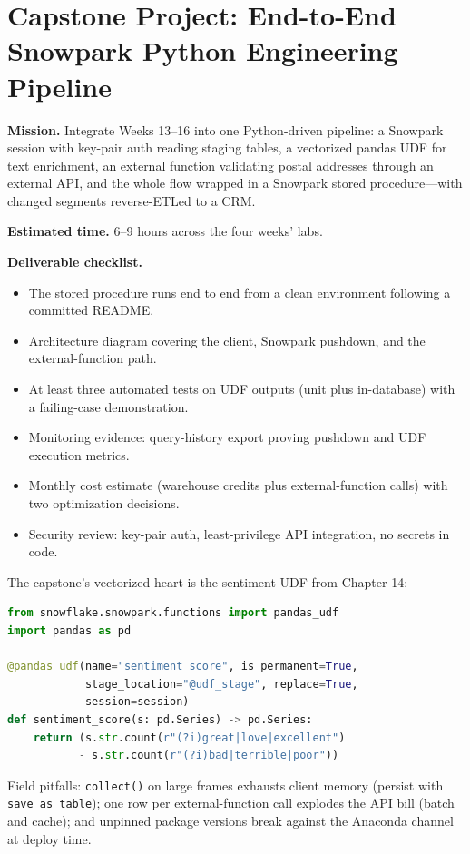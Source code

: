 \section{Capstone Project: End-to-End Snowpark Python Engineering Pipeline}\label{sec:ch16-capstone}
\begin{capstonebox}
\textbf{Mission.} Integrate Weeks 13--16 into one Python-driven pipeline: a Snowpark session with key-pair auth reading staging tables, a vectorized pandas UDF for text enrichment, an external function validating postal addresses through an external API, and the whole flow wrapped in a Snowpark stored procedure---with changed segments reverse-ETLed to a CRM.

\textbf{Estimated time.} 6--9 hours across the four weeks' labs.

\textbf{Deliverable checklist.}
\begin{itemize}
    \item The stored procedure runs end to end from a clean environment following a committed README.
    \item Architecture diagram covering the client, Snowpark pushdown, and the external-function path.
    \item At least three automated tests on UDF outputs (unit plus in-database) with a failing-case demonstration.
    \item Monitoring evidence: query-history export proving pushdown and UDF execution metrics.
    \item Monthly cost estimate (warehouse credits plus external-function calls) with two optimization decisions.
    \item Security review: key-pair auth, least-privilege API integration, no secrets in code.
\end{itemize}
\end{capstonebox}

The capstone's vectorized heart is the sentiment UDF from Chapter 14:

\begin{lstlisting}[language=Python, caption={Vectorized pandas UDF for sentiment}]
from snowflake.snowpark.functions import pandas_udf
import pandas as pd

@pandas_udf(name="sentiment_score", is_permanent=True,
            stage_location="@udf_stage", replace=True,
            session=session)
def sentiment_score(s: pd.Series) -> pd.Series:
    return (s.str.count(r"(?i)great|love|excellent")
           - s.str.count(r"(?i)bad|terrible|poor"))
\end{lstlisting}

Field pitfalls: \texttt{collect()} on large frames exhausts client memory (persist with \texttt{save\_as\_table}); one row per external-function call explodes the API bill (batch and cache); and unpinned package versions break against the Anaconda channel at deploy time.
